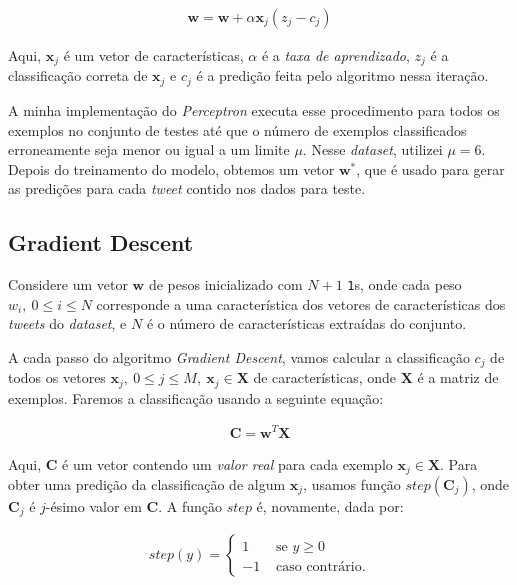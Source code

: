 \documentclass[a4paper, 12pt]{article}
\begin{document}
\begin{align*}
    \boldsymbol{w} = \boldsymbol{w} + \alpha\boldsymbol{x}_j(z_j - c_j)
\end{align*}

Aqui, $\boldsymbol{x}_j$ é um vetor de características, $\alpha$ é a
\textit{taxa de aprendizado}, $z_j$ é a classificação correta de
$\boldsymbol{x}_j$ e $c_j$ é a predição feita pelo algoritmo nessa iteração.

A minha implementação do \textit{Perceptron} executa esse procedimento para
todos os exemplos no conjunto de testes até que o número de exemplos
classificados erroneamente seja menor ou igual a um limite $\mu$. Nesse
\textit{dataset}, utilizei $\mu = 6$. Depois do treinamento do modelo, obtemos
um vetor $\boldsymbol{w}^{*}$, que é usado para gerar as predições para cada \textit{tweet}
contido nos dados para teste.

\subsection{Gradient Descent} \label{sec:gd}

Considere um vetor $\boldsymbol{w}$ de pesos inicializado
com $N + 1$ \texttt{1}s, onde cada peso $w_i,\: 0 \leq i \leq N$
corresponde a uma característica dos vetores de características
dos \textit{tweets} do \textit{dataset}, e $N$ é o número
de características extraídas do conjunto.

A cada passo do algoritmo \textit{Gradient Descent}, vamos calcular a
classificação $c_j$ de todos os vetores $\boldsymbol{x}_j,\: 0 \leq j \leq M,\: \boldsymbol{x}_j \in
\boldsymbol{X}$ de características, onde $\boldsymbol{X}$ é a matriz
de exemplos. Faremos a classificação usando a seguinte equação:

\begin{align*}
    \boldsymbol{C} = \boldsymbol{w}^{T}\boldsymbol{X}
\end{align*}

Aqui, $\boldsymbol{C}$ é um vetor contendo um \textit{valor real} para
cada exemplo $\boldsymbol{x}_j \in \boldsymbol{X}$. Para obter uma predição
da classificação de algum $\boldsymbol{x}_j$, usamos função $step(\boldsymbol{C}_j)$,
onde $\boldsymbol{C}_j$ é $j$-ésimo valor em $\boldsymbol{C}$. A função $step$
é, novamente, dada por:

\begin{align*}
    step(y) = \begin{cases}
        1 & \text{ se } y \geq 0 \\
        -1 & \text{ caso contrário.}
    \end{cases}
\end{align*}
\end{document}
